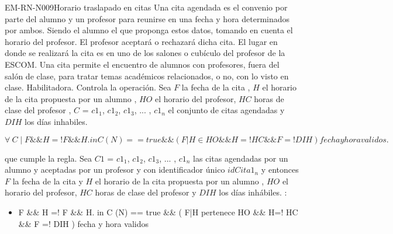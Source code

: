 \begin{BussinesRule}{EM-RN-N009}{Horario traslapado en citas}
	\BRitem[Descripción:] Una cita agendada es el convenio por parte del alumno y un profesor para reunirse
	en una fecha y hora determinados por ambos. Siendo el alumno el que proponga estos datos, tomando
	en cuenta el horario del profesor. El profesor aceptará o rechazará dicha cita.
	El lugar en donde se realizará la cita es en uno de los salones o cubículo del profesor de la ESCOM.
	Una cita permite el encuentro de alumnos con profesores, fuera del salón de clase, para tratar temas
	académicos relacionados, o no, con lo visto en clase.
	\BRitem[Tipo:] Habilitadora.
	\BRitem[Nivel:] Controla la operación.
	\BRitem[Sentencia: ] Sea $F$ la fecha de la cita , $H$ el horario de la cita propuesta por un alumno , $HO$ el horario del profesor, $HC$ horas de clase del profesor , $C$ = {$c1_{1}$, $c1_{2}$, $c1_{3}$, ... , $c1_{n}$} el conjunto de citas agendadas y $DIH$ los días inhabiles.
	\begin{center}
		$\forall \: C \mid F \&\& H =! F \&\& H. in C (N) == true \&\& (F|H \in HO \&\& H=! HC \&\& F =! DIH ) fecha y hora validos.$

	\end{center}
	 que cumple la regla.
		Sea $C1$ = {$c1_{1}$, $c1_{2}$, $c1_{3}$, ... , $c1_{n}$} las citas agendadas por un alumno y
		aceptadas por un profesor y con identificador único $idCita1_{n}$ y  entonces $F$ la fecha de la cita y $H$ el horario de la cita propuesta por un alumno , $HO$ el horario del profesor, $HC$ horas de clase del profesor y $DIH$ los días inhábiles. :
		\begin{itemize}
			\item  F \&\& H =! F \&\& H. in C (N) == true \&\& (
		F|H pertenece HO \&\& H=! HC \&\& F =! DIH ) fecha y hora validos
		\end{itemize}
\end{BussinesRule}

